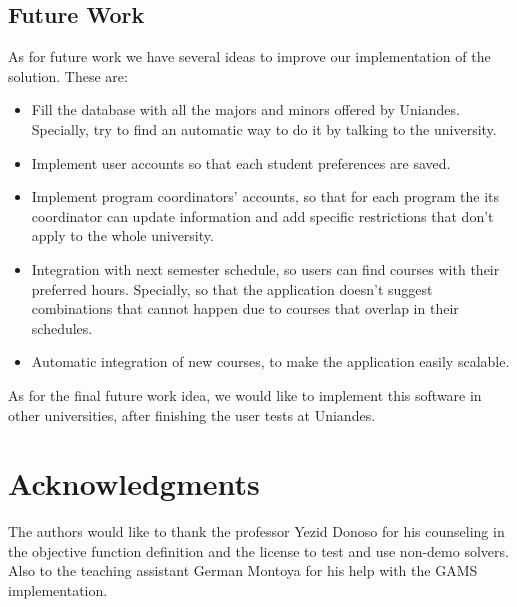 \documentclass[journal]{IEEEtran}
\begin{document}
\subsection{Future Work}
As for future work we have several ideas to improve our implementation of the solution. These are:\\

\begin{itemize}
    \item Fill the database with all the majors and minors offered by Uniandes. Specially, try to find an automatic way to do it by talking to the university.\\ 
    \item Implement user accounts so that each student preferences are saved. \\
    \item Implement program coordinators' accounts, so that for each program the its coordinator can update information and add specific restrictions that don't apply to the whole university.\\
    \item Integration with next semester schedule, so users can find courses with their preferred hours. Specially, so that the application doesn't suggest combinations that cannot happen due to courses that overlap in their schedules.\\
    \item Automatic integration of new courses, to make the application easily scalable.\\
\end{itemize}

As for the final future work idea, we would like to implement this software in other universities, after finishing the user tests at Uniandes. \\

\section*{Acknowledgments}
The authors would like to thank the professor Yezid Donoso for his counseling in the objective function definition and the license to test and use non-demo solvers. Also to the teaching assistant German Montoya for his help with the GAMS implementation. \\ 

\end{document}
